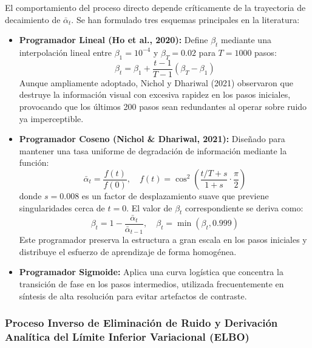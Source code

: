 El comportamiento del proceso directo depende críticamente de la trayectoria de decaimiento de $\bar{\alpha}_t$. Se han formulado tres esquemas principales en la literatura:

\begin{itemize}
    \item \textbf{Programador Lineal (Ho et al., 2020):} Define $\beta_t$ mediante una interpolación lineal entre $\beta_1 = 10^{-4}$ y $\beta_T = 0.02$ para $T=1000$ pasos:
    \begin{equation}
    \beta_t = \beta_1 + \frac{t-1}{T-1} (\beta_T - \beta_1)
    \end{equation}
    Aunque ampliamente adoptado, Nichol y Dhariwal (2021) observaron que destruye la información visual con excesiva rapidez en los pasos iniciales, provocando que los últimos 200 pasos sean redundantes al operar sobre ruido ya imperceptible.
    
    \item \textbf{Programador Coseno (Nichol \& Dhariwal, 2021):} Diseñado para mantener una tasa uniforme de degradación de información mediante la función:
    \begin{equation}
    \bar{\alpha}_t = \frac{f(t)}{f(0)}, \quad f(t) = \cos^2\left( \frac{t/T + s}{1 + s} \cdot \frac{\pi}{2} \right)
    \end{equation}
    donde $s = 0.008$ es un factor de desplazamiento suave que previene singularidades cerca de $t=0$. El valor de $\beta_t$ correspondiente se deriva como:
    \begin{equation}
    \beta_t = 1 - \frac{\bar{\alpha}_t}{\bar{\alpha}_{t-1}}, \quad \beta_t = \min(\beta_t, 0.999)
    \end{equation}
    Este programador preserva la estructura a gran escala en los pasos iniciales y distribuye el esfuerzo de aprendizaje de forma homogénea.
    
    \item \textbf{Programador Sigmoide:} Aplica una curva logística que concentra la transición de fase en los pasos intermedios, utilizada frecuentemente en síntesis de alta resolución para evitar artefactos de contraste.
\end{itemize}

\subsubsection{Proceso Inverso de Eliminación de Ruido y Derivación Analítica del Límite Inferior Variacional (ELBO)}

